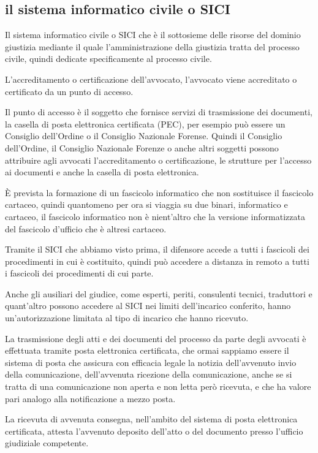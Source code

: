 \subsection{il sistema informatico civile o SICI}
Il sistema informatico civile o SICI che è il sottosieme delle risorse del dominio giustizia mediante il quale l'amministrazione della giustizia tratta del processo civile, quindi dedicate specificamente al processo civile. 

L'accreditamento o certificazione dell'avvocato, l'avvocato viene accreditato o certificato da un punto di accesso. 

Il punto di accesso è il soggetto che fornisce servizi di trasmissione dei documenti, la casella di posta elettronica certificata (PEC), per esempio può essere un Consiglio dell'Ordine o il Consiglio Nazionale Forense. Quindi il Consiglio dell'Ordine, il Consiglio Nazionale Forenze o anche altri soggetti possono attribuire agli avvocati l'accreditamento o certificazione, le strutture per l'accesso ai documenti e anche la casella di posta elettronica. 

È prevista la formazione di un fascicolo informatico che non sostituisce il fascicolo cartaceo, quindi quantomeno per ora si viaggia su due binari, informatico e cartaceo, il fascicolo informatico non è nient'altro che la versione informatizzata del fascicolo d'ufficio che è altresi cartaceo. 

Tramite il SICI che abbiamo visto prima, il difensore accede a tutti i fascicoli dei procedimenti in cui è costituito, quindi può accedere a distanza in remoto a tutti i fascicoli dei procedimenti di cui parte.

Anche gli ausiliari del giudice, come esperti, periti, consulenti tecnici, traduttori e quant'altro possono accedere al SICI nei limiti dell'incarico conferito, hanno un'autorizzazione limitata al tipo di incarico che hanno ricevuto. 

La trasmissione degli atti e dei documenti del processo da parte degli avvocati è effettuata tramite posta elettronica certificata, che ormai sappiamo essere il sistema di posta che assicura con efficacia legale la notizia dell'avvenuto invio della comunicazione, dell'avvenuta ricezione della comunicazione, anche se si tratta di una comunicazione non aperta e non letta però ricevuta, e che ha valore pari analogo alla notificazione a mezzo posta. 

La ricevuta di avvenuta consegna, nell'ambito del sistema di posta elettronica certificata, attesta l'avvenuto deposito dell'atto o del documento presso l'ufficio giudiziale competente. 

